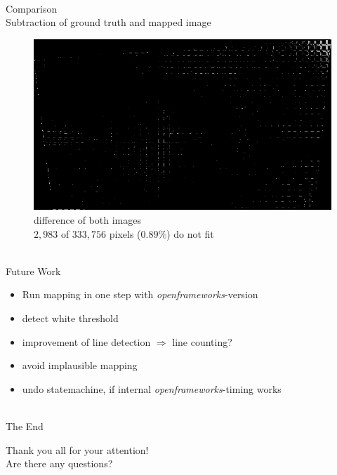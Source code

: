 \documentclass[accentcolor=tud4b,colorbacktitle,inverttitle,landscape,german,presentation,t]{tudbeamer}
\begin{document}
\begin{frame}{\\Comparison\\ \small{Subtraction of ground truth and mapped image}}
\begin{figure}
\vspace{-0.5cm}
\includegraphics[scale=0.35]{substracted}
\caption{difference of both images\\ $2,983$ of $333,756$ pixels ($0.89\%$) do not fit}
\end{figure}

\end{frame}

\begin{frame}{\\Future Work}
\begin{itemize}
\item Run mapping in one step with \emph{openframeworks}-version
\item detect white threshold
\item improvement of line detection $\Rightarrow$ line counting?
\item avoid implausible mapping
\item undo statemachine, if internal \emph{openframeworks}-timing works
\end{itemize}

\end{frame}


\begin{frame}{\\ The End}
\begin{center}
\vspace{1.5 cm}
Thank you all for your attention!\\
Are there any questions?
\end{center}
\end{frame}
\end{document}
